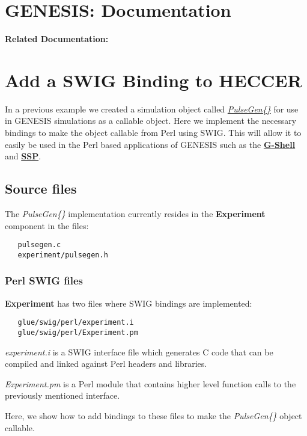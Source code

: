 \documentclass[12pt]{article}
\begin{document}
\section*{GENESIS: Documentation}

{\bf Related Documentation:}

\section*{Add a SWIG Binding to HECCER}

In a previous example we created a simulation object called \href{../genesis-add-object-solver/genesis-add-object-solver.tex}{\it PulseGen\{\}} for use in GENESIS simulations as a callable object. Here we implement the necessary bindings to make the object callable from Perl using SWIG. This will allow it to easily be used in the Perl based applications of GENESIS such as the \href{../gshell/gshell.tex}{\bf G-Shell} and \href{../ssp/ssp.tex}{\bf SSP}.

\subsection*{Source files}

The {\it PulseGen\{\}} implementation currently resides in the {\bf Experiment} component in the files:
\begin{verbatim}
   pulsegen.c
   experiment/pulsegen.h
\end{verbatim}

\subsubsection*{Perl SWIG files}

{\bf Experiment} has two files where SWIG bindings are implemented:

\begin{verbatim}
   glue/swig/perl/experiment.i
   glue/swig/perl/Experiment.pm
\end{verbatim}

{\it experiment.i} is a SWIG interface file which generates C code that can be compiled and linked against Perl headers and libraries.

{\it Experiment.pm} is a Perl module that contains higher level function calls to the previously mentioned interface.

Here, we show how to add bindings to these files to make the {\it PulseGen\{\}} object callable.
\end{document}
